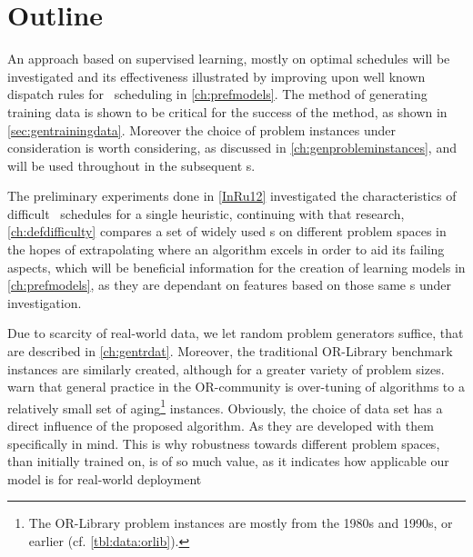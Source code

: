 




\section{Outline}
An approach based on supervised learning, mostly on optimal schedules will be 
investigated and its effectiveness illustrated by improving upon well known 
dispatch rules for \jsp\ scheduling in \cref{ch:prefmodels}. The method of 
generating training data is shown to be critical for the success of the method, 
as shown in \cref{sec:gentrainingdata}. Moreover the choice of problem 
instances under consideration is worth considering, as discussed in 
\cref{ch:genprobleminstances}, and will be used throughout in the subsequent 
s. 

The preliminary experiments done in \cref{InRu12} investigated the 
characteristics of difficult \jsp\ schedules for a single heuristic, continuing 
with that research, \cref{ch:defdifficulty} compares a set of widely used 
\dr s on different problem spaces in the hopes of extrapolating 
where an algorithm excels in order to aid its failing aspects, which will be 
beneficial information for the creation of learning models in 
\cref{ch:prefmodels}, as they are dependant  on features based on those same 
\dr s under investigation.

Due to scarcity of real-world data, we let random problem generators 
suffice, that are described in \cref{ch:gentrdat}. Moreover, the traditional 
OR-Library benchmark instances are similarly created, although for a greater 
variety of problem sizes. 
\citet{SmithMiles2015} warn that general practice in the OR-community is 
over-tuning of algorithms to a relatively small set of aging\footnote{
    The OR-Library problem instances are mostly from the 1980s and 
    1990s, or earlier (cf. \cref{tbl:data:orlib}).}
instances. 
Obviously, the choice of data set has a direct influence of the proposed 
algorithm. As they are developed with them specifically in mind. 
This is why robustness towards different problem spaces, than initially trained 
on, is of so much value, as it indicates how applicable our model is for 
real-world deployment 

